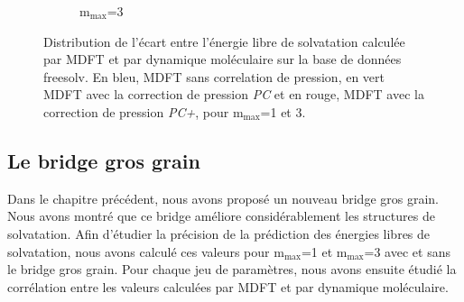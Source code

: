 \begin{figure}[H]
\begin{subfigure}[b]{0.9\textwidth}
{         }
       \caption{$\mathrm{m}_\mathrm{max}$=3}
       \label{fig:distrib_error_PC_PCPlus:mmax3}
    \end{subfigure}
  \caption[Distribution de l'écart entre l'énergie libre de solvatation calculée par MDFT et par dynamique moléculaire sur la base de données freesolv.]{Distribution de l'écart entre l'énergie libre de solvatation calculée par MDFT et par dynamique moléculaire sur la base de données freesolv. En bleu, MDFT sans correlation de pression, en vert MDFT avec la correction de pression \textit{PC} et en rouge, MDFT avec la correction de pression \textit{PC+}, pour $\mathrm{m}_\mathrm{max}$=1 et 3.}
  \label{fig:distrib_error_PC_PCPlus}
\end{figure}



\subsection{Le bridge gros grain}
Dans le chapitre précédent, nous avons proposé un nouveau bridge gros grain. Nous avons montré que ce bridge améliore considérablement les structures de solvatation. Afin d'étudier la précision de la prédiction des énergies libres de solvatation, nous avons calculé ces valeurs pour $\mathrm{m}_\mathrm{max}$=1 et $\mathrm{m}_\mathrm{max}$=3 avec et sans le bridge gros grain. Pour chaque jeu de paramètres, nous avons ensuite étudié la corrélation entre les valeurs calculées par MDFT et par dynamique moléculaire.



